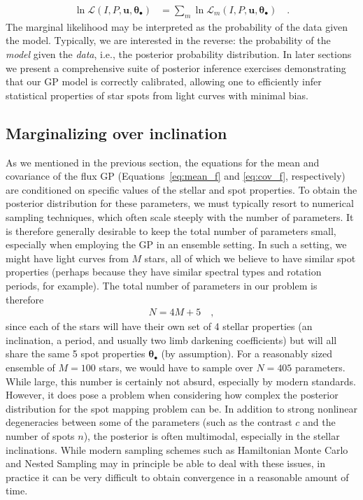 \documentclass[modern]{aastex62}
\begin{document}
%
\begin{align}
    \ln \mathcal{L}\left(I, P, \mathbf{u}, \pmb{\theta}_\bullet\right)
     & =
    \sum_{m} \ln \mathcal{L}_m\left(I, P, \mathbf{u}, \pmb{\theta}_\bullet\right)
    \quad.
\end{align}
%
The marginal likelihood may be interpreted as the probability of the data
given the model. Typically, we are interested in the reverse: the probability
of the \emph{model} given the \emph{data}, i.e., the posterior probability
distribution. In later sections we present a comprehensive suite of
posterior inference exercises demonstrating that our GP model is correctly
calibrated, allowing one to efficiently infer statistical properties of star spots
from light curves with minimal bias.


\subsection{Marginalizing over inclination}
\label{sec:inclination}
%
As we mentioned in the previous section,
the equations for the mean and covariance of the flux GP
(Equations~\ref{eq:mean_f} and \ref{eq:cov_f}, respectively) are conditioned
on specific values of the stellar and spot properties. To obtain the posterior distribution
for these parameters, we must typically resort to numerical sampling techniques,
which often scale steeply with the number of parameters. It is therefore generally
desirable to keep the total number of parameters small, especially when
employing the GP in an ensemble setting.
In such a setting, we might have light curves from $M$ stars, all of which
we believe to have similar spot properties (perhaps because they have
similar spectral types and rotation periods, for example).
The total number of parameters in our problem is therefore
%
\begin{align}
    N = 4 M + 5
    \quad,
\end{align}
%
since each of the stars will have their own set of 4 stellar properties
(an inclination, a period, and usually two limb darkening coefficients)
but will all share the same 5 spot properties
$\pmb{\theta}_\bullet$ (by assumption).
For a reasonably sized ensemble of $M=100$
stars, we would have to sample over $N = 405$ parameters.
While large, this number is certainly not absurd, especially by modern standards.
However, it does pose
a problem when considering how complex the posterior distribution for the
spot mapping problem can be. In addition to strong nonlinear degeneracies
between some of the parameters (such as the contrast $c$ and the
number of spots $n$), the posterior is often multimodal, especially in the
stellar inclinations. While modern sampling schemes such as Hamiltonian
Monte Carlo and Nested Sampling may in principle be able to deal with these
issues, in practice it can be very difficult to obtain convergence in a
reasonable amount of time.
\end{document}
